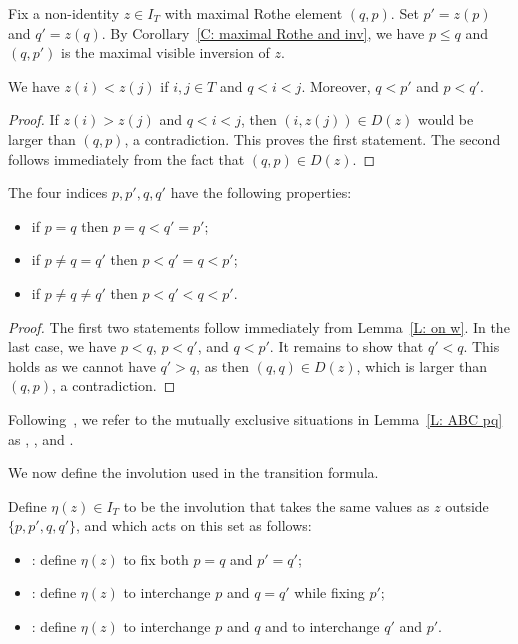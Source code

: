 \documentclass[10pt]{article}
\begin{document}
Fix a non-identity  $ z\in I_T$
with maximal Rothe element $(q,p)$.
Set $p'=z(p)$ and $q'=z(q)$.
By Corollary~\ref{C: maximal Rothe and inv},
we have
$p\leq q$ and 
$(q,p')$ is the maximal visible inversion of $z$.

\begin{lemma}
\label{L: on w}
We have $z(i)<z(j)$
if $i, j \in T$ and $q < i < j$.
Moreover, $q<p'$ and $p<q'$.
\end{lemma}

\begin{proof}
If $z(i) > z(j)$ and $q<i<j$,
then $(i,z(j))\in D(z)$ would be larger than $(q,p)$,
a contradiction.
This proves the first statement.
The second follows immediately from the fact that
$(q,p)\in D(z)$.
\end{proof}

\begin{lemma}
\label{L: ABC pq}
The four indices $p,p',q,q'$ have the following properties:
\begin{itemize}
\item[(A)] if $p=q$ then $p=q<q'=p'$;
\item[(B)] if $p\ne q=q'$ then $p<q'=q<p'$;
\item[(C)] if $p\neq q\neq q'$ then $p<q'<q<p'$.
\end{itemize}
\end{lemma}

\begin{proof}
The first two statements follow immediately
from Lemma~\ref{L: on w}. %
In the last case, we have $p<q$, $p<q'$, and $q<p'$.
It remains to show that $q'<q$.
This holds as we cannot have $q'>q$, as then $(q,q)\in D(z)$,
which is larger than $(q,p)$,
a contradiction.
\end{proof}


Following~\cite[Section~4]{HMPstanley},
we 
refer to the mutually exclusive situations in 
Lemma~\ref{L: ABC pq} as \CaseA, \CaseB, and \CaseC.



We now define the involution used in the transition formula.

\begin{definition}
\label{D: eta(w)}
Define $\eta(z)\in I_T$ to be the involution that takes the same 
values as $z$ outside
$\{p,p',q,q'\}$, and which acts on this set as follows:
\begin{itemize}
\item[] \CaseA:
define $\eta(z)$ to fix both $p=q$ and $p'=q'$;

\item[] \CaseB:
define $\eta(z)$ to interchange $p$ and $q=q'$ while fixing $p'$;

\item[] \CaseC:
define $\eta(z)$ to interchange $p$ and $q$
and to interchange $q'$ and $p'$.
\end{itemize}
\end{definition}
\end{document}

